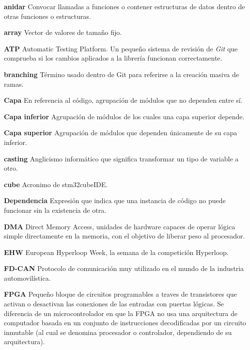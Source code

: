 \documentclass{report}
\begin{document}
\textbf{anidar} Convocar llamadas a funciones o contener estructuras de datos dentro de otras funciones o estructuras.
\par \vspace{0.2 cm}
\textbf{array} Vector de valores de tamaño fijo.
\par \vspace{0.2 cm}
\textbf{ATP} Automatic Testing Platform. Un pequeño sistema de revisión de \textit{Git} que comprueba si los cambios aplicados a la librería funcionan correctamente.
\par \vspace{0.2 cm}
\textbf{branching} Término usado dentro de Git para referirse a la creación masiva de ramas. 
\par \vspace{0.2 cm}
\textbf{Capa} En referencia al código, agrupación de módulos que no dependen entre sí.
\par \vspace{0.2 cm}
\textbf{Capa inferior} Agrupación de módulos de los cuales una capa superior depende.
\par \vspace{0.2 cm}
\textbf{Capa superior} Agrupación de módulos que dependen únicamente de su capa inferior.
\par \vspace{0.2 cm}
\textbf{casting} Anglicismo informático que significa transformar un tipo de variable a otro.
\par \vspace{0.2 cm}
\textbf{cube} Acronimo de stm32cubeIDE.
\par \vspace{0.2 cm}
\textbf{Dependencia} Expresión que indica que una instancia de código no puede funcionar sin la existencia de otra. 
\par \vspace{0.2 cm}
\textbf{DMA} Direct Memory Access, unidades de hardware capaces de operar lógica simple directamente en la memoria, con el objetivo de liberar peso al procesador. 
\par \vspace{0.2 cm}
\textbf{EHW} European Hyperloop Week, la semana de la competición Hyperloop.
\par \vspace{0.2 cm}
\textbf{FD-CAN} Protocolo de comunicación muy utilizado en el mundo de la industria automovilística.
\par \vspace{0.2 cm}
\textbf{FPGA} Pequeño bloque de circuitos programables a traves de transistores que activan o desactivan las conexiones de las entradas con puertas lógicas. Se diferencia de un microcontrolador en que la FPGA no usa una arquitectura de computador basada en un conjunto de instrucciones decodificadas por un circuito inmutable (al cual se denomina procesador o controlador, dependiendo de su arquitectura).
\end{document}
